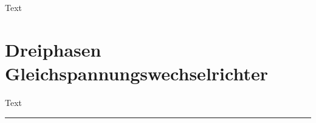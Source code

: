 \documentclass[10pt,landscape]{scrartcl}
\begin{document}
\begin{multicols}{2}
Text

\vfill\null
\columnbreak
\section{Dreiphasen Gleichspannungswechselrichter}
Text

\clearpage

\rule{0.3\linewidth}{0.25pt}
%
%
\end{multicols}
\end{document}
